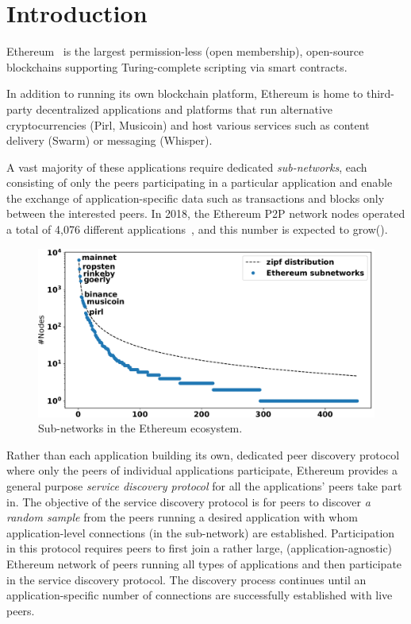 
\section{Introduction}

Ethereum~\cite{buterin2013ethereum}  is the largest permission-less (\ie open membership), open-source blockchains supporting Turing-complete scripting via smart contracts. 

In addition to running its own blockchain platform, Ethereum is home to third-party decentralized applications and platforms that run alternative cryptocurrencies (Pirl, Musicoin) and host various services such as content delivery (Swarm) or messaging (Whisper).

A vast majority of these applications require dedicated \emph{sub-networks}, each consisting of only the peers participating in a particular application and enable the exchange of application-specific data such as transactions and blocks only between the interested peers. In 2018, the Ethereum P2P network nodes operated a total of 4,076 different applications~\cite{kim2018measuring}, and this number is expected to grow().

\begin{figure}
    \includegraphics[width=1\linewidth]{img/ecosystem}
    \caption{Sub-networks in the Ethereum ecosystem.}
    \label{fig:ecosystem}
\end{figure}

Rather than each application building its own, dedicated peer discovery protocol where only the peers of individual applications participate, Ethereum provides a general purpose \textit{service discovery protocol} for all the applications' peers take part in. The objective of the service discovery protocol is for peers to discover \textit{a random sample} from the peers running a desired application with whom application-level connections (\ie in the sub-network) are established. Participation in this protocol requires peers to first join a rather large, (application-agnostic) Ethereum network of peers running all types of applications and then participate in the service discovery protocol. The discovery process continues until an application-specific number of connections are successfully established with live peers. 

